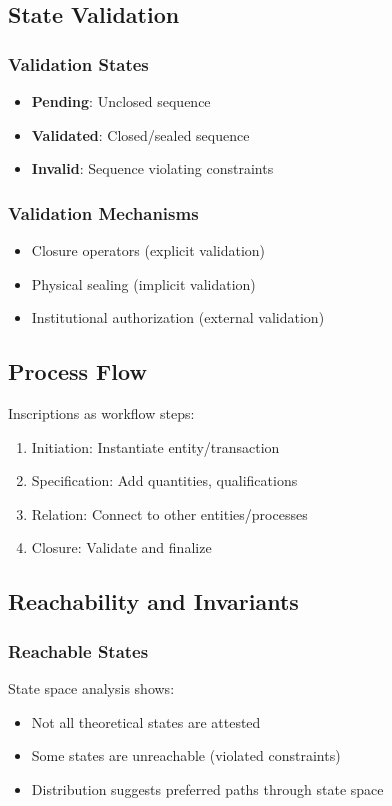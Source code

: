 \subsection{State Validation}

\subsubsection{Validation States}
\begin{itemize}
    \item \textbf{Pending}: Unclosed sequence
    \item \textbf{Validated}: Closed/sealed sequence
    \item \textbf{Invalid}: Sequence violating constraints
\end{itemize}

\subsubsection{Validation Mechanisms}
\begin{itemize}
    \item Closure operators (explicit validation)
    \item Physical sealing (implicit validation)
    \item Institutional authorization (external validation)
\end{itemize}

\subsection{Process Flow}

Inscriptions as workflow steps:
\begin{enumerate}
    \item Initiation: Instantiate entity/transaction
    \item Specification: Add quantities, qualifications
    \item Relation: Connect to other entities/processes
    \item Closure: Validate and finalize
\end{enumerate}

\subsection{Reachability and Invariants}

\subsubsection{Reachable States}
State space analysis shows:
\begin{itemize}
    \item Not all theoretical states are attested
    \item Some states are unreachable (violated constraints)
    \item Distribution suggests preferred paths through state space
\end{itemize}

